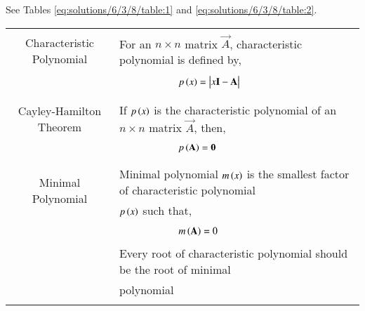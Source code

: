 See Tables \ref{eq:solutions/6/3/8/table:1} and \ref{eq:solutions/6/3/8/table:2}.
%
\begin{table*}[ht!]
\centering
\begin{tabular}{|c|l|}
    \hline
	\multirow{3}{*}{Characteristic Polynomial} 
	& \\
	& For an $n\times n$ matrix $\vec{A}$, characteristic polynomial is defined by,\\
	&\\
	& $\qquad\qquad\qquad p\brak{x}=\mydet{x\Vec{I}-\Vec{A}}$\\
	&\\
	\hline
	\multirow{3}{*}{Cayley-Hamilton Theorem}
    &\\
    & If $p\left(x\right)$ is the characteristic polynomial of an $n\times n$ matrix $\vec{A}$, then,\\
    &\\
    &$\qquad \qquad \qquad p\left(\mathbf{A}\right)=\mathbf{0}$\\
    &\\
    \hline
	\multirow{3}{*}{Minimal Polynomial} 
	&\\
	& Minimal polynomial $m\left(x\right)$ is the smallest factor of characteristic polynomial\\
	& $p\left(x\right)$ such that,\\
	&\\
	& $\qquad \qquad \qquad m\left(\mathbf{A}\right)=0$\\
	& \\
	& Every root of characteristic polynomial should be the root of minimal\\
	& polynomial\\
	&\\
    \hline
\end{tabular}
    \caption{Definitions}
\label{eq:solutions/6/3/8/table:1}
\end{table*}
\onecolumn
